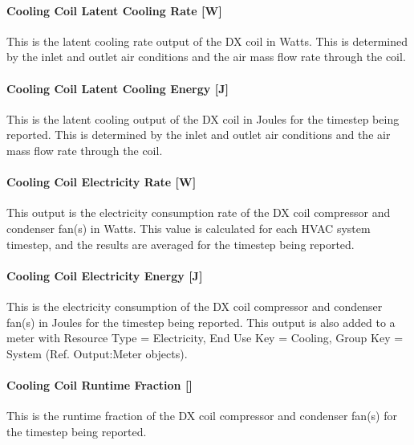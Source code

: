 \paragraph{Cooling Coil Latent Cooling Rate {[}W{]}}\label{cooling-coil-latent-cooling-rate-w-2}

This is the latent cooling rate output of the DX coil in Watts. This is determined by the inlet and outlet air conditions and the air mass flow rate through the coil.

\paragraph{Cooling Coil Latent Cooling Energy {[}J{]}}\label{cooling-coil-latent-cooling-energy-j-2}

This is the latent cooling output of the DX coil in Joules for the timestep being reported. This is determined by the inlet and outlet air conditions and the air mass flow rate through the coil.

\paragraph{Cooling Coil Electricity Rate {[}W{]}}\label{cooling-coil-electric-power-w}

This output is the electricity consumption rate of the DX coil compressor and condenser fan(s) in Watts. This value is calculated for each HVAC system timestep, and the results are averaged for the timestep being reported.

\paragraph{Cooling Coil Electricity Energy {[}J{]}}\label{cooling-coil-electric-energy-j}

This is the electricity consumption of the DX coil compressor and condenser fan(s) in Joules for the timestep being reported. This output is also added to a meter with Resource Type = Electricity, End Use Key = Cooling, Group Key = System (Ref. Output:Meter objects).

\paragraph{Cooling Coil Runtime Fraction {[]}}\label{cooling-coil-runtime-fraction-2}

This is the runtime fraction of the DX coil compressor and condenser fan(s) for the timestep being reported.

